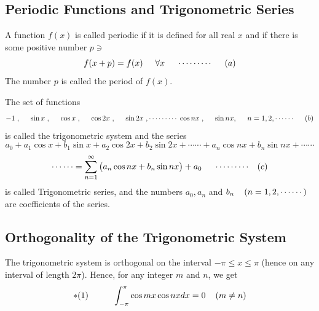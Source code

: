 \documentclass[11pt,a4paper]{article}
\theoremstyle{definition}
\begin{document}
{\color[wave]{485}\subsection{Periodic Functions and Trigonometric Series}}
A function $f(x)$ is called periodic if it is defined for all real $x$ and if there is some positive number $p\ni $ $$f(x + p) = f(x) \hspace{0.5cm} \forall x \hspace{0.5cm}\cdots\cdots\cdots\hspace{0.5cm} (a)$$ The number $p$ is called the period of $f(x)$.


The set of functions $$-1\hspace{0.1cm}, \hspace{0.5cm} \sin x\hspace{0.1cm} , \hspace{0.5cm} \cos x\hspace{0.1cm}, \hspace{0.5cm} \cos 2x\hspace{0.1cm},\hspace{0.5cm} \sin 2x\hspace{0.1cm}, \cdots\cdots\cdots\hspace{0.1cm} \cos nx\hspace{0.1cm},\hspace{0.5cm} \sin nx, \hspace{0.5cm} n = 1,2,\cdots\cdots\hspace{0.5cm} (b)$$ is called the trigonometric system and the series 
$$a_0 + a_1\cos x + b_1\sin x + a_2\cos 2x + b_2\sin 2x + \cdots\cdots + a_n\cos nx + b_n \sin nx + \cdots\cdots$$ $$\cdots\cdots =\sum^{\infty}_{n=1}\big(a_n \cos nx + b_n \sin nx\big) + a_0 \hspace{0.5cm} \cdots\cdots\cdots\hspace{0.3cm} (c)$$ is called Trigonometric series, and the numbers $a_0, a_n$ and $b_n\hspace{0.4cm} (n = 1,2,\cdots\cdots)$ are coefficients of the series.


{\color[wave]{485}\subsection{Orthogonality of the Trigonometric System}}
The trigonometric system is orthogonal on the interval $-\pi \leq x \leq \pi$ (hence on any interval of length $2\pi$). Hence, for any integer $m$ and $n$, we get $$* (1)\hspace{1cm} \int^{\pi}_{-\pi} \cos m x \cos n x dx = 0\hspace{0.4cm} ( m\neq n) $$
\end{document}
